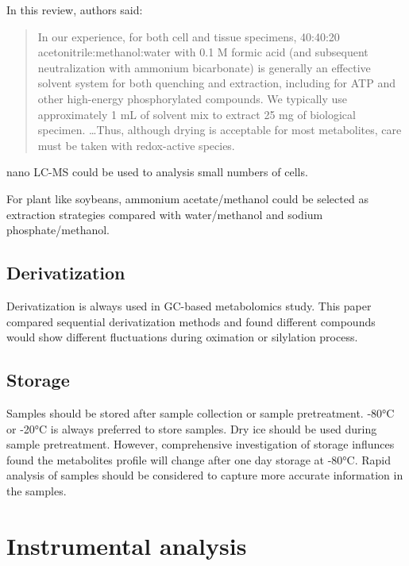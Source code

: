 \documentclass[
]{book}
\begin{document}
In this review\citep{lu2017}, authors said:

\begin{quote}
In our experience, for both cell and tissue specimens, 40:40:20 acetonitrile:methanol:water with 0.1 M formic acid (and subsequent neutralization with ammonium bicarbonate) is generally an effective solvent system for both quenching and extraction, including for ATP and other high-energy phosphorylated compounds. We typically use approximately 1 mL of solvent mix to extract 25 mg of biological specimen. \ldots Thus, although drying is acceptable for most metabolites, care must be taken with redox-active species.
\end{quote}

\citep{luo2017a} nano LC-MS could be used to analysis small numbers of cells.

For plant like soybeans\citep{mahmud2017}, ammonium acetate/methanol could be selected as extraction strategies compared with water/methanol and sodium phosphate/methanol.

\hypertarget{derivatization}{%
\section{Derivatization}\label{derivatization}}

Derivatization is always used in GC-based metabolomics study. This paper\citep{miyagawa2019} compared sequential derivatization methods and found different compounds would show different fluctuations during oximation or silylation process.

\hypertarget{storage}{%
\section{Storage}\label{storage}}

Samples should be stored after sample collection or sample pretreatment. -80°C or -20°C is always preferred to store samples. Dry ice should be used during sample pretreatment. However, comprehensive investigation of storage influnces found the metabolites profile will change after one day storage at -80°C. Rapid analysis of samples should be considered to capture more accurate information in the samples.

\hypertarget{instrumental-analysis}{%
\chapter{Instrumental analysis}\label{instrumental-analysis}}
\end{document}
